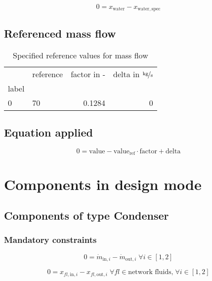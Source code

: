 \documentclass[]{article}
\begin{document}
\begin{equation}
\label{eq:Connection_water}
0 = x_\mathrm{water} - x_\mathrm{water,spec}
\end{equation}

\subsection{Referenced mass flow}

\begin{table}[H]
\centering
\caption{Specified reference values for mass flow}
\begin{tabular}{llrr}
\toprule
{} & reference &  factor in - &  delta in $\unitfrac[]{kg}{s}$ \\
label &           &              &                                \\
\midrule
0     &        70 &       0.1284 &                              0 \\
\bottomrule
\end{tabular}
\end{table}
\subsection{Equation applied}

\begin{equation}
\label{eq:Connection_ref}
0 = \text{value} - \text{value}_\mathrm{ref} \cdot \mathrm{factor} + \text{delta}
\end{equation}

\section{Components in design mode}

\subsection{Components of type Condenser}

\subsubsection{Mandatory constraints}

\begin{equation}
\label{eq:Condenser_mass_flow_constraints}
0=\dot{m}_{\mathrm{in,}i}-\dot{m}_{\mathrm{out,}i}\; \forall i \in [1, 2]
\end{equation}

\begin{equation}
\label{eq:Condenser_fluid_constraints}
0=x_{fl\mathrm{,in,}i}-x_{fl\mathrm{,out,}i}\;\forall fl \in\text{network fluids,}\; \forall i \in [1, 2]
\end{equation}
\end{document}
